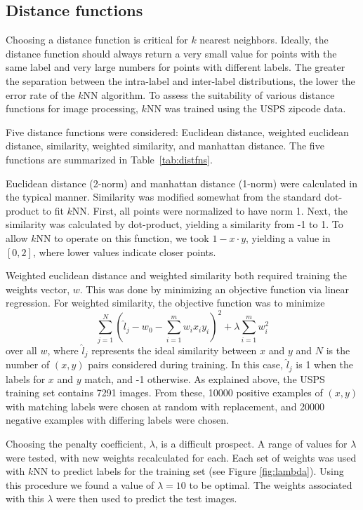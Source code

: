 \documentclass[10pt,twocolumn,letterpaper]{article}
\begin{document}
\subsection{Distance functions}
\label{distancefunctions} 

Choosing a distance function is critical for $k$ nearest neighbors. Ideally, the distance function should always return a very small value for points with the same label and very large numbers for points with different labels. The greater the separation between the intra-label and inter-label distributions, the lower the error rate of the $k$NN algorithm.  To assess the suitability of various distance functions for image processing, $k$NN was trained using the USPS zipcode data.

Five distance functions were considered: Euclidean distance, weighted euclidean distance, similarity, weighted similarity, and manhattan distance. The five functions are summarized in Table~\ref{tab:distfns}.

Euclidean distance (2-norm) and manhattan distance (1-norm) were calculated in the typical manner. Similarity was modified somewhat from the standard dot-product to fit $k$NN. First, all points were normalized to have norm 1. Next, the similarity was calculated by dot-product, yielding a similarity from -1 to 1. To allow $k$NN to operate on this function, we took $1-x\cdot y$, yielding a value in $[0,2]$, where lower values indicate closer points.

Weighted euclidean distance and weighted similarity both required training the weights vector, $w$. This was done by minimizing an objective function via linear regression. 
For weighted similarity, the objective function was to minimize
\[ \sum_{j=1}^N \left( \hat{l}_j - w_0 - \sum_{i=1}^m w_i x_i y_i  \right) ^2  + \lambda \sum_{i=1}^m w_i^2 \]
over all $w$, where $\hat{l}_j$ represents the ideal similarity between $x$ and $y$ and $N$ is the number of $(x,y)$ pairs considered during training. In this case, $\hat{l}_j$ is 1 when the labels for $x$ and $y$ match, and -1 otherwise. As explained above, the USPS training set contains 7291 images. From these, 10000 positive examples of $(x,y)$ with matching labels were chosen at random with replacement, and 20000 negative examples with differing labels were chosen.

Choosing the penalty coefficient, $\lambda$, is a difficult prospect. A range of values for $\lambda$ were tested, with new weights recalculated for each. Each set of weights was used with $k$NN to predict labels for the training set (see Figure \ref{fig:lambda}). Using this procedure we found a value of $\lambda=10$ to be optimal. The weights associated with this $\lambda$ were then used to predict the test images.
\end{document}

